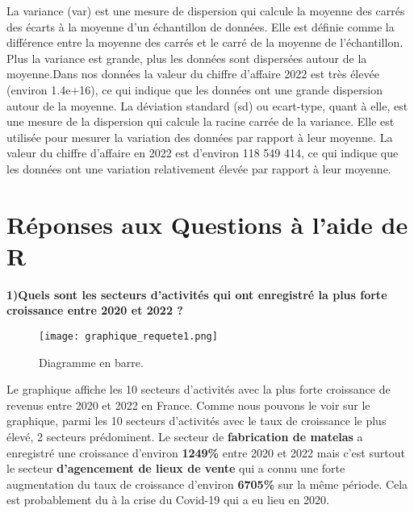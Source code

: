 \documentclass[mstat,12pt]{unswthesis}
\begin{document}
La variance (var) est une mesure de dispersion qui calcule la moyenne
des carrés des écarts à la moyenne d'un échantillon de données. Elle est
définie comme la différence entre la moyenne des carrés et le carré de
la moyenne de l'échantillon. Plus la variance est grande, plus les
données sont dispersées autour de la moyenne.Dans nos données la valeur
du chiffre d'affaire 2022 est très élevée (environ 1.4e+16), ce qui
indique que les données ont une grande dispersion autour de la moyenne.
La déviation standard (sd) ou ecart-type, quant à elle, est une mesure
de la dispersion qui calcule la racine carrée de la variance. Elle est
utilisée pour mesurer la variation des données par rapport à leur
moyenne. La valeur du chiffre d'affaire en 2022 est d'environ 118 549
414, ce qui indique que les données ont une variation relativement
élevée par rapport à leur moyenne.

\bigskip

\hypertarget{ruxe9ponses-aux-questions-uxe0-laide-de-r}{%
\section{\texorpdfstring{\textbf{Réponses aux Questions à l'aide de
R}}{Réponses aux Questions à l'aide de R}}\label{ruxe9ponses-aux-questions-uxe0-laide-de-r}}

\medskip

\textbf{1)Quels sont les secteurs d'activités qui ont enregistré la plus
forte croissance entre 2020 et 2022 ?}

\medskip

\begin{figure}
\centering
\texttt{[image: graphique\_requete1.png]}
\caption{Diagramme en barre.}
\end{figure}

\medskip

Le graphique affiche les 10 secteurs d'activités avec la plus forte
croissance de revenus entre 2020 et 2022 en France. Comme nous pouvons
le voir sur le graphique, parmi les 10 secteurs d'activités avec le taux
de croissance le plus élevé, 2 secteurs prédominent. Le secteur de
\textbf{fabrication de matelas} a enregistré une croissance d'environ
\textbf{1249\%} entre 2020 et 2022 mais c'est surtout le secteur
\textbf{d'agencement de lieux de vente} qui a connu une forte
augmentation du taux de croissance d'environ \textbf{6705\%} sur la même
période. Cela est probablement du à la crise du Covid-19 qui a eu lieu
en 2020.
\end{document}
